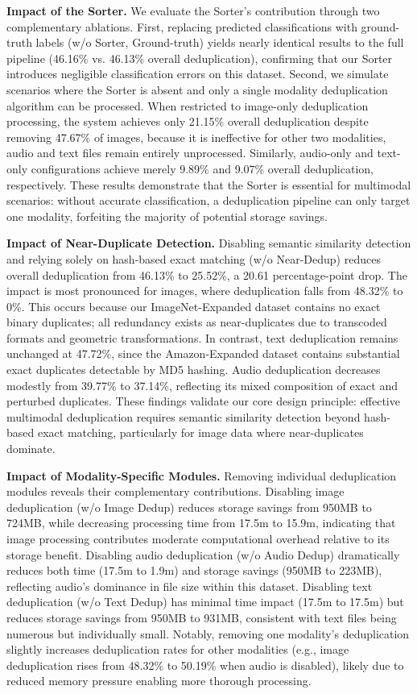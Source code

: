\documentclass[sigconf, nonacm]{acmart}
\begin{document}
\textbf{Impact of the Sorter.} We evaluate the Sorter's contribution through two complementary ablations. First, replacing predicted classifications with ground-truth labels (w/o Sorter, Ground-truth) yields nearly identical results to the full pipeline (46.16\% vs. 46.13\% overall deduplication), confirming that our Sorter introduces negligible classification errors on this dataset. Second, we simulate scenarios where the Sorter is absent and only a single modality deduplication algorithm can be processed. When restricted to image-only deduplication processing, the system achieves only 21.15\% overall deduplication despite removing 47.67\% of images, because it is ineffective for other two modalities, audio and text files remain entirely unprocessed. Similarly, audio-only and text-only configurations achieve merely 9.89\% and 9.07\% overall deduplication, respectively. These results demonstrate that the Sorter is essential for multimodal scenarios: without accurate classification, a deduplication pipeline can only target one modality, forfeiting the majority of potential storage savings.

\textbf{Impact of Near-Duplicate Detection.} Disabling semantic similarity detection and relying solely on hash-based exact matching (w/o Near-Dedup) reduces overall deduplication from 46.13\% to 25.52\%, a 20.61 percentage-point drop. The impact is most pronounced for images, where deduplication falls from 48.32\% to 0\%. This occurs because our ImageNet-Expanded dataset contains no exact binary duplicates; all redundancy exists as near-duplicates due to transcoded formats and geometric transformations. In contrast, text deduplication remains unchanged at 47.72\%, since the Amazon-Expanded dataset contains substantial exact duplicates detectable by MD5 hashing. Audio deduplication decreases modestly from 39.77\% to 37.14\%, reflecting its mixed composition of exact and perturbed duplicates. These findings validate our core design principle: effective multimodal deduplication requires semantic similarity detection beyond hash-based exact matching, particularly for image data where near-duplicates dominate.

\textbf{Impact of Modality-Specific Modules.} Removing individual deduplication modules reveals their complementary contributions. Disabling image deduplication (w/o Image Dedup) reduces storage savings from 950MB to 724MB, while decreasing processing time from 17.5m to 15.9m, indicating that image processing contributes moderate computational overhead relative to its storage benefit. Disabling audio deduplication (w/o Audio Dedup) dramatically reduces both time (17.5m to 1.9m) and storage savings (950MB to 223MB), reflecting audio's dominance in file size within this dataset. Disabling text deduplication (w/o Text Dedup) has minimal time impact (17.5m to 17.5m) but reduces storage savings from 950MB to 931MB, consistent with text files being numerous but individually small. Notably, removing one modality's deduplication slightly increases deduplication rates for other modalities (e.g., image deduplication rises from 48.32\% to 50.19\% when audio is disabled), likely due to reduced memory pressure enabling more thorough processing.
\end{document}
